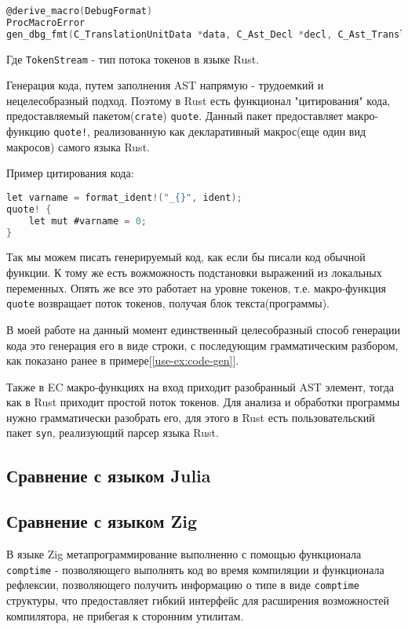 \begin{lstlisting}[language=C, caption={Заголовок процедурного макроса EC}, label={langcmp:rust:ec_pmh}]
@derive_macro(DebugFormat)
ProcMacroError
gen_dbg_fmt(C_TranslationUnitData *data, C_Ast_Decl *decl, C_Ast_TranslationUnit **out_node);
\end{lstlisting}

Где \verb|TokenStream| - тип потока токенов в языке Rust.

Генерация кода, путем заполнения AST напрямую - трудоемкий и нецелесобразный подход.
Поэтому в Rust есть функционал "цитирования" кода, предоставляемый пакетом(\verb|crate|) \verb|quote|\cite{rust-quote}.
Данный пакет предоставляет макро-функцию \verb|quote!|, реализованную как декларативный макрос(еще один вид макросов) самого языка Rust.

Пример цитирования кода:
\begin{lstlisting}[language=C, caption={Заголовок процедурного макроса Rust}, label={langcmp:rust:rust_quote}]
let varname = format_ident!("_{}", ident);
quote! {
    let mut #varname = 0;
}
\end{lstlisting}

Так мы можем писать генерируемый код, как если бы писали код обычной функции. К тому же есть вожможность подстановки выражений из локальных переменных.
Опять же все это работает на уровне токенов, т.е. макро-функция \verb|quote| возвращает поток токенов, получая блок текста(программы).

В моей работе на данный момент единственный целесобразный способ генерации кода это генерация его в виде строки, с последующим грамматическим разбором, как показано ранее в примере[\ref{use-ex:code-gen}].

Также в EC макро-функциях на вход приходит разобранный AST элемент, тогда как в Rust приходит простой поток токенов.
Для анализа и обработки программы нужно грамматически разобрать его, для этого в Rust есть пользовательский пакет \verb|syn|\cite{rust-syn}, реализующий парсер языка Rust.


\subsection{Сравнение с языком Julia}
\label{langcmp:julia}


\subsection{Сравнение с языком Zig}
В языке Zig метапрограммирование выполненно с помощью функционала \verb|comptime| - позволяющего выполнять код во время компиляции и функционала рефлексии, 
позволяющего получить информацию о типе в виде \verb|comptime| структуры, что предоставляет гибкий интерфейс для расширения возможностей компилятора, не прибегая 
к сторонним утилитам.